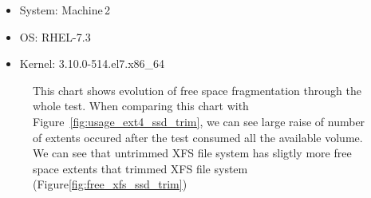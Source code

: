 \documentclass[
  color, %
  table, %
  lof,   %
  lot,   %
]{fithesis3}
\begin{document}
\begin{itemize}
\itemsep0em 
   \item System: Machine\,2
   \item OS: RHEL-7.3
   \item Kernel: 3.10.0-514.el7.x86\_64
\end{itemize}

\begin{figure}[h]
    \centering
    \caption[Evolution of free space fragmentation of XFS during testing on SSD without regular trimming]{This chart shows evolution of free space fragmentation through the whole test. When comparing this chart with Figure~\ref{fig:usage_ext4_ssd_trim}, we can see large raise of number of extents occured after the test consumed all the available volume. We can see that untrimmed XFS file system has sligtly more free space extents that trimmed XFS file system (Figure\ref{fig:free_xfs_ssd_trim})}
    \label{fig:free_xfs_ssd_notrim}
\end{figure}
\end{document}

